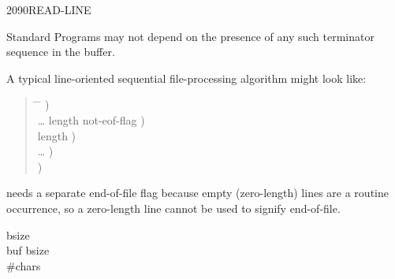 \begin{worddef}{2090}{READ-LINE}
\begin{rationale}
		Standard Programs may not depend on the presence of any such
		terminator sequence in the buffer.

		A typical line-oriented sequential file-processing algorithm
		might look like:

		\begin{quote}\ttfamily{}
		  \begin{tabbing}
			\tab \= \hspace{12em} \= \kill
							\>\>  ) \\
			\> {\ldots}  
										\>	 \word{p} length not-eof-flag ) \\
			 			\>\>  length ) \\
			\> {\ldots}				\>	  ) \\
			 	\>\>  ) \\
		  \end{tabbing}
		\end{quote}

		 needs a separate end-of-file flag because
		empty (zero-length) lines are a routine occurrence, so a
		zero-length line cannot be used to signify end-of-file.
	\end{rationale}

	\begin{testing} %
		  bsize \\
		 buf bsize  \\
		 \#chars

		 \\
		 \\
		 \\
		 \\
	\end{testing}
\end{worddef}



